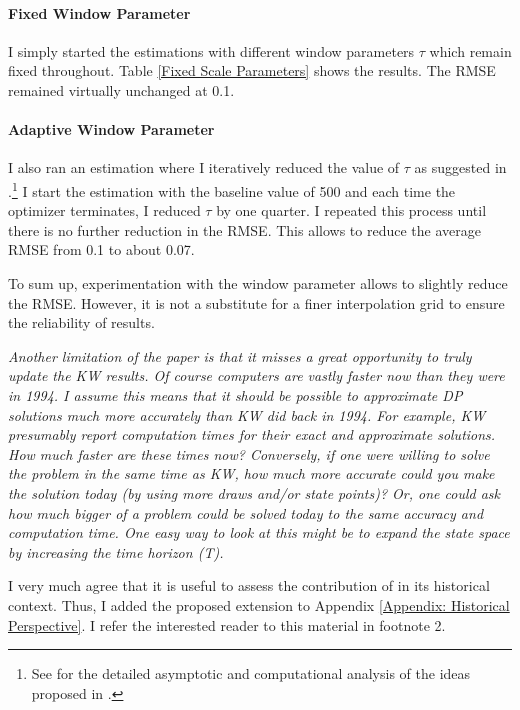 \begin{boenumerate}
\paragraph{Fixed Window Parameter} I simply started the estimations with different window parameters $\tau$ which remain fixed throughout. Table \ref{Fixed Scale Parameters} shows the results. The RMSE remained virtually unchanged at 0.1.



\paragraph{Adaptive Window Parameter} I also ran an estimation where I iteratively reduced the value of $\tau$ as suggested in \citet{Keane.2003}.\footnote{See \citet{Bruins.2015} for the detailed asymptotic and computational analysis of the ideas proposed in \citet{Keane.2003}.} I start the estimation with the baseline value of 500 and each time the optimizer terminates, I reduced $\tau$ by one quarter. I repeated this process until there is no further reduction in the RMSE. This allows to reduce the average RMSE from 0.1 to about 0.07.\newline

To sum up, experimentation with the window parameter allows to slightly reduce the RMSE. However, it is not a substitute for a finer interpolation grid to ensure the reliability of results.\newline
\item \textit{Another limitation of the paper is that it misses a great opportunity to truly update the KW results. Of course computers are vastly faster now than they were in 1994. I assume this means that it should be possible to approximate DP solutions much more accurately than KW did back in 1994. For example, KW presumably report computation times for their exact and approximate solutions. How much faster are these times now? Conversely, if one were willing to solve the problem in the same time as KW, how much more accurate could you make the solution today (by using more draws and/or state points)? Or, one could ask how much bigger of a problem could be solved today to the same accuracy and computation time. One easy way to look at this might be to expand the state space by increasing the time horizon (T).}\vspace{0.5cm}

I very much agree that it is useful to assess the contribution of \citet{Keane.1994} in its historical context. Thus, I added the proposed extension to Appendix \ref{Appendix: Historical Perspective}. I refer the interested reader to this material in footnote 2.
\end{boenumerate}

